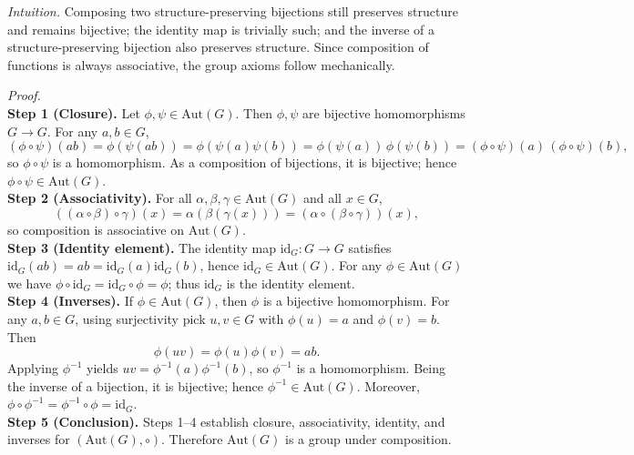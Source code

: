\documentclass[12pt]{article}
\theoremstyle{definition}
\begin{document}
\newpage

\dotfill

\emph{Intuition.} Composing two structure-preserving bijections still preserves structure and remains bijective; the identity map is trivially such; and the inverse of a structure-preserving bijection also preserves structure. Since composition of functions is always associative, the group axioms follow mechanically.\\

\dotfill

\emph{Proof.}\\
\textbf{Step 1 (Closure).} Let $\phi,\psi\in\mathrm{Aut}(G)$. Then $\phi,\psi$ are bijective homomorphisms $G\to G$. For any $a,b\in G$, 
\[
(\phi\circ\psi)(ab)=\phi(\psi(ab))=\phi(\psi(a)\psi(b))=\phi(\psi(a))\,\phi(\psi(b))=(\phi\circ\psi)(a)\,(\phi\circ\psi)(b),
\]
so $\phi\circ\psi$ is a homomorphism. As a composition of bijections, it is bijective; hence $\phi\circ\psi\in\mathrm{Aut}(G)$.\\
\textbf{Step 2 (Associativity).} For all $\alpha,\beta,\gamma\in\mathrm{Aut}(G)$ and all $x\in G$,
\[
((\alpha\circ\beta)\circ\gamma)(x)=\alpha(\beta(\gamma(x)))=(\alpha\circ(\beta\circ\gamma))(x),
\]
so composition is associative on $\mathrm{Aut}(G)$.\\
\textbf{Step 3 (Identity element).} The identity map $\mathrm{id}_G:G\to G$ satisfies $\mathrm{id}_G(ab)=ab=\mathrm{id}_G(a)\mathrm{id}_G(b)$, hence $\mathrm{id}_G\in\mathrm{Aut}(G)$. For any $\phi\in\mathrm{Aut}(G)$ we have $\phi\circ\mathrm{id}_G=\mathrm{id}_G\circ\phi=\phi$; thus $\mathrm{id}_G$ is the identity element.\\
\textbf{Step 4 (Inverses).} If $\phi\in\mathrm{Aut}(G)$, then $\phi$ is a bijective homomorphism. For any $a,b\in G$, using surjectivity pick $u,v\in G$ with $\phi(u)=a$ and $\phi(v)=b$. Then
\[
\phi(u v)=\phi(u)\phi(v)=ab.
\]
Applying $\phi^{-1}$ yields $uv=\phi^{-1}(a)\phi^{-1}(b)$, so $\phi^{-1}$ is a homomorphism. Being the inverse of a bijection, it is bijective; hence $\phi^{-1}\in\mathrm{Aut}(G)$. Moreover, $\phi\circ\phi^{-1}=\phi^{-1}\circ\phi=\mathrm{id}_G$.\\
\textbf{Step 5 (Conclusion).} Steps 1–4 establish closure, associativity, identity, and inverses for $(\mathrm{Aut}(G),\circ)$. Therefore $\mathrm{Aut}(G)$ is a group under composition.\\
\end{document}
